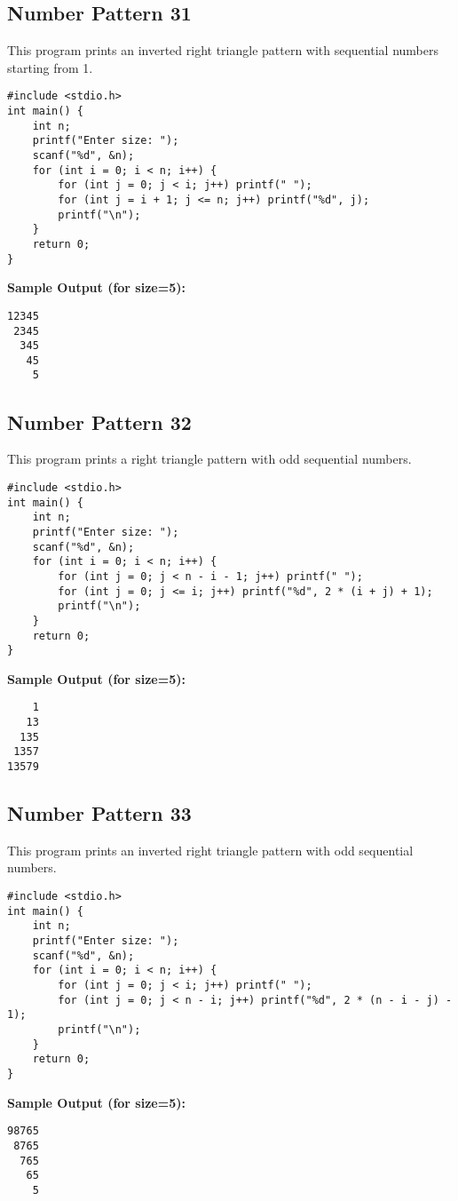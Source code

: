 \documentclass[a4paper,12pt]{article}
\begin{document}
\subsection{Number Pattern 31}
This program prints an inverted right triangle pattern with sequential numbers starting from 1.
\begin{lstlisting}[caption={Number Pattern 31}]
#include <stdio.h>
int main() {
    int n;
    printf("Enter size: ");
    scanf("%d", &n);
    for (int i = 0; i < n; i++) {
        for (int j = 0; j < i; j++) printf(" ");
        for (int j = i + 1; j <= n; j++) printf("%d", j);
        printf("\n");
    }
    return 0;
}
\end{lstlisting}
\textbf{Sample Output (for size=5):}
\begin{verbatim}
12345
 2345
  345
   45
    5
\end{verbatim}
\clearpage

\subsection{Number Pattern 32}
This program prints a right triangle pattern with odd sequential numbers.
\begin{lstlisting}[caption={Number Pattern 32}]
#include <stdio.h>
int main() {
    int n;
    printf("Enter size: ");
    scanf("%d", &n);
    for (int i = 0; i < n; i++) {
        for (int j = 0; j < n - i - 1; j++) printf(" ");
        for (int j = 0; j <= i; j++) printf("%d", 2 * (i + j) + 1);
        printf("\n");
    }
    return 0;
}
\end{lstlisting}
\textbf{Sample Output (for size=5):}
\begin{verbatim}
    1
   13
  135
 1357
13579
\end{verbatim}
\clearpage

\subsection{Number Pattern 33}
This program prints an inverted right triangle pattern with odd sequential numbers.
\begin{lstlisting}[caption={Number Pattern 33}]
#include <stdio.h>
int main() {
    int n;
    printf("Enter size: ");
    scanf("%d", &n);
    for (int i = 0; i < n; i++) {
        for (int j = 0; j < i; j++) printf(" ");
        for (int j = 0; j < n - i; j++) printf("%d", 2 * (n - i - j) - 1);
        printf("\n");
    }
    return 0;
}
\end{lstlisting}
\textbf{Sample Output (for size=5):}
\begin{verbatim}
98765
 8765
  765
   65
    5
\end{verbatim}
\clearpage
\end{document}
